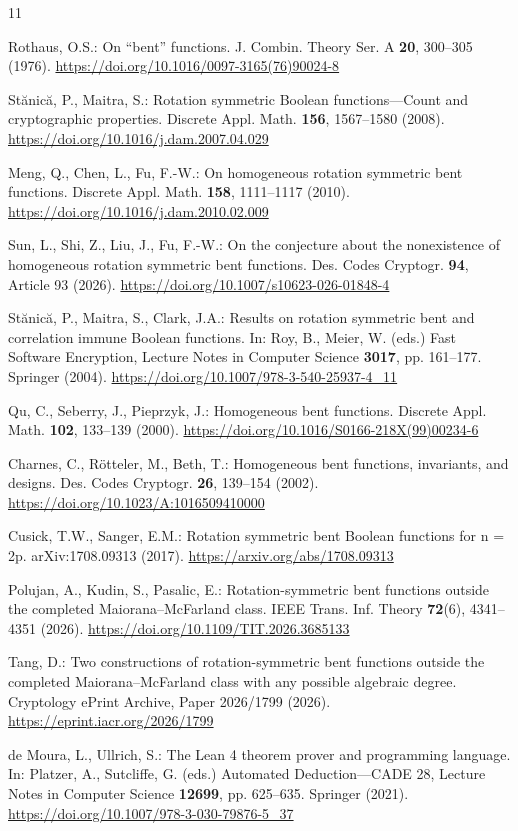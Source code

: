 \documentclass[pdflatex,sn-mathphys-num]{sn-jnl}
\begin{document}
\clearpage\begin{thebibliography}{11}

 Rothaus, O.S.: On ``bent'' functions. J. Combin. Theory Ser. A \textbf{20}, 300--305 (1976). \url{https://doi.org/10.1016/0097-3165(76)90024-8}

 St\u{a}nic\u{a}, P., Maitra, S.: Rotation symmetric Boolean functions---Count and cryptographic properties. Discrete Appl. Math. \textbf{156}, 1567--1580 (2008). \url{https://doi.org/10.1016/j.dam.2007.04.029}

 Meng, Q., Chen, L., Fu, F.-W.: On homogeneous rotation symmetric bent functions. Discrete Appl. Math. \textbf{158}, 1111--1117 (2010). \url{https://doi.org/10.1016/j.dam.2010.02.009}

 Sun, L., Shi, Z., Liu, J., Fu, F.-W.: On the conjecture about the nonexistence of homogeneous rotation symmetric bent functions. Des. Codes Cryptogr. \textbf{94}, Article 93 (2026). \url{https://doi.org/10.1007/s10623-026-01848-4}

 St\u{a}nic\u{a}, P., Maitra, S., Clark, J.A.: Results on rotation symmetric bent and correlation immune Boolean functions. In: Roy, B., Meier, W. (eds.) Fast Software Encryption, Lecture Notes in Computer Science \textbf{3017}, pp. 161--177. Springer (2004). \url{https://doi.org/10.1007/978-3-540-25937-4_11}

 Qu, C., Seberry, J., Pieprzyk, J.: Homogeneous bent functions. Discrete Appl. Math. \textbf{102}, 133--139 (2000). \url{https://doi.org/10.1016/S0166-218X(99)00234-6}

 Charnes, C., Rötteler, M., Beth, T.: Homogeneous bent functions, invariants, and designs. Des. Codes Cryptogr. \textbf{26}, 139--154 (2002). \url{https://doi.org/10.1023/A:1016509410000}

 Cusick, T.W., Sanger, E.M.: Rotation symmetric bent Boolean functions for n = 2p. arXiv:1708.09313 (2017). \url{https://arxiv.org/abs/1708.09313}

 Polujan, A., Kudin, S., Pasalic, E.: Rotation-symmetric bent functions outside the completed Maiorana--McFarland class. IEEE Trans. Inf. Theory \textbf{72}(6), 4341--4351 (2026). \url{https://doi.org/10.1109/TIT.2026.3685133}

 Tang, D.: Two constructions of rotation-symmetric bent functions outside the completed Maiorana--McFarland class with any possible algebraic degree. Cryptology ePrint Archive, Paper 2026/1799 (2026). \url{https://eprint.iacr.org/2026/1799}

 de Moura, L., Ullrich, S.: The Lean 4 theorem prover and programming language. In: Platzer, A., Sutcliffe, G. (eds.) Automated Deduction---CADE 28, Lecture Notes in Computer Science \textbf{12699}, pp. 625--635. Springer (2021). \url{https://doi.org/10.1007/978-3-030-79876-5_37}
\end{thebibliography}
\end{document}
